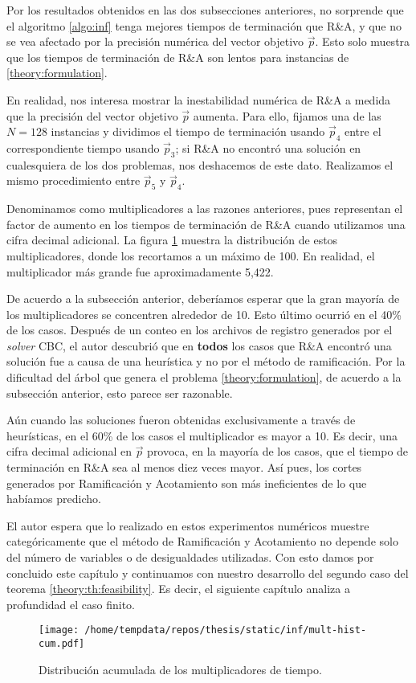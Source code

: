 Por los resultados obtenidos en las dos subsecciones anteriores, no sorprende que el algoritmo
\ref{algo:inf} tenga mejores tiempos de terminación que R\&A, y que no se vea afectado por la
precisión numérica del vector objetivo $\vec{p}$. Esto solo muestra que los tiempos de terminación
de R\&A son lentos para instancias de \eqref{theory:formulation}.

En realidad, nos interesa mostrar la inestabilidad numérica de R\&A a medida que la precisión del
vector objetivo $\vec{p}$ aumenta. Para ello, fijamos una de las $N = 128$ instancias y dividimos el
tiempo de terminación usando $\vec{p}_4$ entre el correspondiente tiempo usando $\vec{p}_3$; si
R\&A no encontró una solución en cualesquiera de los dos problemas, nos deshacemos de este
dato. Realizamos el mismo procedimiento entre $\vec{p}_5$ y $\vec{p}_4$.

Denominamos como multiplicadores a las razones anteriores, pues representan el factor de aumento en
los tiempos de terminación de R\&A cuando utilizamos una cifra decimal adicional. La figura
\ref{fig:exp:inf:hist} muestra la distribución de estos multiplicadores, donde los recortamos a un
máximo de 100. En realidad, el multiplicador más grande fue aproximadamente 5{,}422.

De acuerdo a la subsección anterior, deberíamos esperar que la gran mayoría de los multiplicadores
se concentren alrededor de 10. Esto último ocurrió en el 40\% de los casos. Después de un conteo en
los archivos de registro generados por el \textit{solver} CBC, el autor descubrió que en
\textbf{todos} los casos que R\&A encontró una solución fue a causa de una heurística y no por el
método de ramificación. Por la dificultad del árbol que genera el problema
\eqref{theory:formulation}, de acuerdo a la subsección anterior, esto parece ser razonable.

Aún cuando las soluciones fueron obtenidas exclusivamente a través de heurísticas, en el 60\% de los
casos el multiplicador es mayor a 10. Es decir, una cifra decimal adicional en $\vec{p}$ provoca, en la
mayoría de los casos, que el tiempo de terminación en R\&A sea al menos diez veces mayor. Así pues,
los cortes generados por Ramificación y Acotamiento son más ineficientes de lo que habíamos
predicho.

El autor espera que lo realizado en estos experimentos numéricos muestre categóricamente que el
método de Ramificación y Acotamiento no depende solo del número de variables o de desigualdades
utilizadas. Con esto damos por concluido este capítulo y continuamos con nuestro
desarrollo del segundo caso del teorema \ref{theory:th:feasibility}. Es decir, el siguiente capítulo
analiza a profundidad el caso finito.

\begin{figure}[hbtp]
	\centering
    \texttt{[image: /home/tempdata/repos/thesis/static/inf/mult-hist-cum.pdf]}
	\caption{Distribución acumulada de los multiplicadores de tiempo.}
	\label{fig:exp:inf:hist}
\end{figure}
